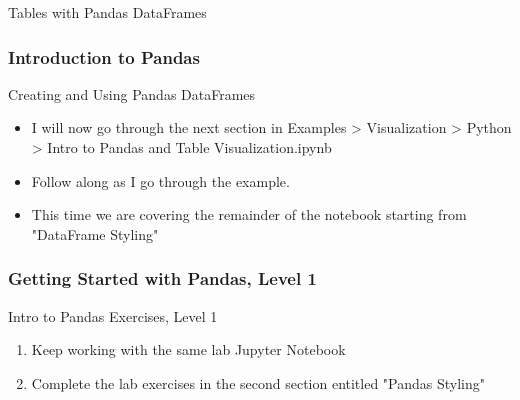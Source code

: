 \documentclass[handout, 11pt]{beamer}
\begin{document}
\begin{section}[Pandas]{Tables with Pandas DataFrames}
\begin{frame}
\frametitle{Introduction to Pandas}
{
\begin{block}{Creating and Using Pandas DataFrames}
\begin{itemize}
\item I will now go through the next section in Examples > Visualization > Python > Intro to Pandas and Table Visualization.ipynb
\item Follow along as I go through the example.
\item This time we are covering the remainder of the notebook starting from "DataFrame Styling"
\end{itemize}
\end{block}
}
\end{frame}
\begin{frame}
\frametitle{Getting Started with Pandas, Level 1}
{
\begin{block}{Intro to Pandas Exercises, Level 1}
\begin{enumerate}
\item Keep working with the same lab Jupyter Notebook
\item Complete the lab exercises in the second section entitled "Pandas Styling"
\end{enumerate}
\vfill
\end{block}
}
\label{labs:intro-pandas-1}
\end{frame}
\end{section}
\end{document}
